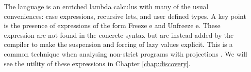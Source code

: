 The language is an enriched lambda calculus with many of the usual
conveniences: case expressions, recursive lets, and user defined types. A key
point is the presence of expressions of the form \<Freeze e\> and \<Unfreeze
e\>.  These expression are not found in the concrete syntax but are instead
added by the compiler to make the suspension and forcing of lazy values
explicit. This is a common technique when analysing non-strict programs with
projections \citep{patersonCompProj, hinze1995projection}. We will see the
utility of these expressions in Chapter \ref{chap:discovery}.

